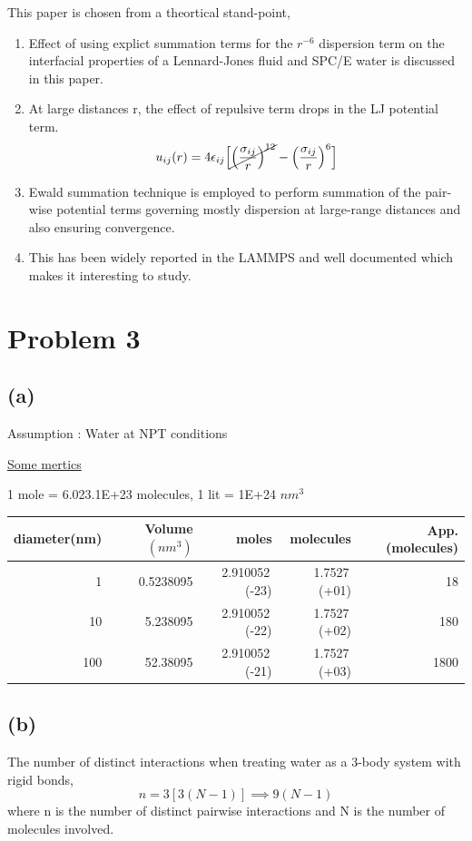 \documentclass{article}
\begin{document}
This paper is chosen from a theortical stand-point,

\begin{enumerate}
\item Effect of using explict summation terms for the $r^{-6}$ dispersion term on the interfacial properties of a Lennard-Jones fluid and SPC/E water is discussed in this paper.
\item At large distances r, the effect of repulsive term drops in the LJ potential term. $$u_{ij}(r) = 4\epsilon_{ij}\Big[\cancel{\Big(\frac{\sigma_{ij}}{r}\Big)^{12}} - \Big(\frac{\sigma_{ij}}{r}\Big)^6\Big]$$
\item Ewald summation technique is employed to perform summation of the pair-wise potential terms governing mostly dispersion at large-range distances and also ensuring convergence.
\item This has been widely reported in the LAMMPS and well documented which makes it interesting to study.
\end{enumerate}

\section{Problem 3}
\label{sec-3}
\subsection{(a)}
\label{sec-3-1}
Assumption : Water at NPT conditions

\uline{Some mertics}

1 mole = 6.023.1E+23 molecules, 1 lit = 1E+24 $nm^3$

\begin{center}
\begin{tabular}{rrrrr}
\hline
diameter(nm) & Volume$(nm^3)$ & moles & molecules & App. (molecules)\\
\hline
1 & 0.5238095 & 2.910052\,(-23) & 1.7527\,(+01) & 18\\
10 & 5.238095 & 2.910052\,(-22) & 1.7527\,(+02) & 180\\
100 & 52.38095 & 2.910052\,(-21) & 1.7527\,(+03) & 1800\\
\hline
\end{tabular}
\end{center}

\subsection{(b)}
\label{sec-3-2}
The number of distinct interactions when treating water as a 3-body system with rigid bonds, 
$$ n = 3[3(N-1)] \implies 9(N-1) $$ 
where n is the number of distinct pairwise interactions and N is the number of molecules involved. 
\end{document}

